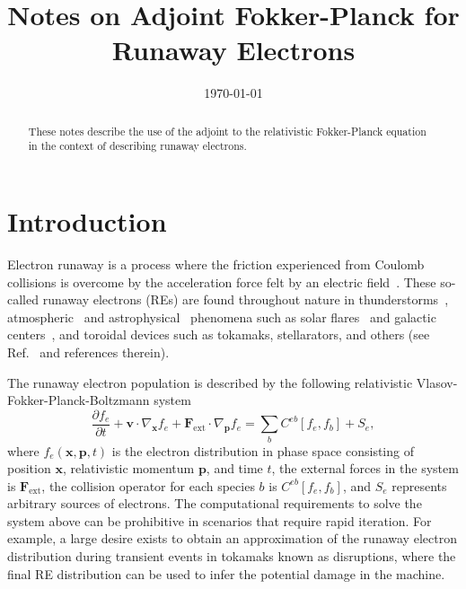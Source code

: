 \documentclass[preprint,aip]{revtex4-2}
\begin{document}
\title{Notes on Adjoint Fokker-Planck for Runaway Electrons}


\date{\today}

\begin{abstract}
These notes describe the use of the adjoint to the relativistic Fokker-Planck equation in the context of describing runaway electrons.
\end{abstract}

\maketitle
\section{Introduction}
Electron runaway is a process where the friction experienced from Coulomb collisions is overcome by the acceleration force felt by an electric field~\cite{wilson1925acceleration}. These so-called runaway electrons (REs) are found throughout nature in thunderstorms~\cite{gurevich1992runaway}, atmospheric~\cite{fishman1994discovery,bell1995runaway} and  astrophysical~\cite{hoyle1949some} phenomena such as solar flares~\cite{holman1985acceleration} and galactic centers~\cite{lesch1992origin}, and toroidal devices such as tokamaks, stellarators, and others (see Ref.~\cite{knoepfel1979runaway} and references therein).

The runaway electron population is described by the following relativistic Vlasov-Fokker-Planck-Boltzmann system
\begin{equation*}
\frac{\partial f_e}{\partial t} + \mathbf{v}\cdot\nabla_\mathbf{x}f_e + \mathbf{F}_\mathrm{ext}\cdot\nabla_\mathbf{p}f_e = \sum_b C^{eb}[f_e,f_b] + S_e,
\end{equation*}
where $f_e(\mathbf{x,p},t)$ is the electron distribution in phase space consisting of position $\mathbf{x}$, relativistic momentum $\mathbf{p}$, and time $t$, the external forces in the system is $\mathbf{F}_\mathrm{ext}$, the collision operator for each species $b$ is $C^{eb}[f_e,f_b]$, and $S_e$ represents arbitrary sources of electrons. The computational requirements to solve the system above can be prohibitive in scenarios that require rapid iteration. For example, a large desire exists to obtain an approximation of the runaway electron distribution during transient events in tokamaks known as disruptions, where the final RE distribution can be used to infer the potential damage in the machine. 
\end{document}
